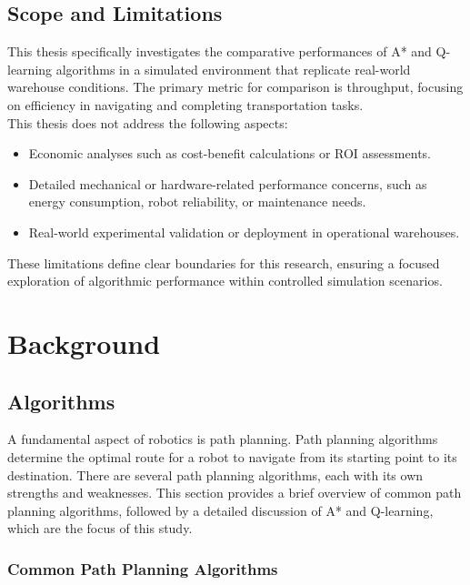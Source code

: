 \documentclass{kththesis}
\begin{document}
\section{Scope and Limitations}
This thesis specifically investigates the comparative performances of A* and Q-learning algorithms in a simulated environment that replicate real-world warehouse conditions. The primary metric for comparison is throughput, focusing on efficiency in navigating and completing transportation tasks. 
\\
This thesis does not address the following aspects:
\\
\begin{itemize}
    \item Economic analyses such as cost-benefit calculations or ROI assessments.
    
    \item Detailed mechanical or hardware-related performance concerns, such as energy consumption, robot reliability, or maintenance needs.

    \item Real-world experimental validation or deployment in operational warehouses. 

\end{itemize}
These limitations define clear boundaries for this research, ensuring a focused exploration of algorithmic performance within controlled simulation scenarios.


\chapter{Background}
\section{Algorithms}

A fundamental aspect of robotics is path planning. Path planning algorithms determine the optimal route for a robot to navigate from its starting point to its destination. There are several path planning algorithms, each with its own strengths and weaknesses. This section provides a brief overview of common path planning algorithms, followed by a detailed discussion of A* and Q-learning, which are the focus of this study.

\subsection{Common Path Planning Algorithms}
\end{document}
